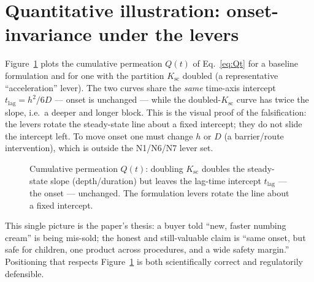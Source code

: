 \documentclass[11pt,a4paper]{article}
\begin{document}
\section{Quantitative illustration: onset-invariance under the levers}
\label{sec:curves}
Figure~\ref{fig:Qt} plots the cumulative permeation $Q(t)$ of
Eq.~\eqref{eq:Qt} for a baseline formulation and for one with the partition
$K_{\mathrm{sc}}$ doubled (a representative ``acceleration'' lever). The two
curves share the \emph{same} time-axis intercept $t_{\mathrm{lag}}=h^2/6D$ ---
onset is unchanged --- while the doubled-$K_{\mathrm{sc}}$ curve has twice the
slope, i.e.\ a deeper and longer block. This is the visual proof of the
falsification: the levers rotate the steady-state line about a fixed intercept;
they do not slide the intercept left. To move onset one must change $h$ or $D$
(a barrier/route intervention), which is outside the N1/N6/N7 lever set.

\begin{figure}[h]
\centering
{}
\caption{Cumulative permeation $Q(t)$: doubling $K_{\mathrm{sc}}$ doubles the
steady-state slope (depth/duration) but leaves the lag-time intercept
$t_{\mathrm{lag}}$ --- the onset --- unchanged. The formulation levers rotate the
line about a fixed intercept.}
\label{fig:Qt}
\end{figure}

This single picture is the paper's thesis: a buyer told ``new, faster numbing
cream'' is being mis-sold; the honest and still-valuable claim is ``same onset,
but safe for children, one product across procedures, and a wide safety
margin.'' Positioning that respects Figure~\ref{fig:Qt} is both scientifically
correct and regulatorily defensible.
\end{document}
